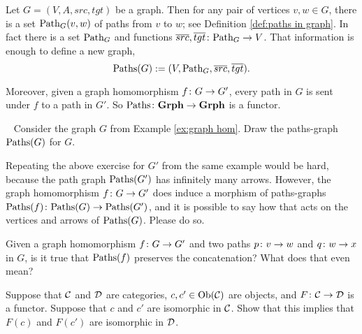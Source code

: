 \begin{example}\label{ex:paths-graph}

Let $G=(V,A,src,tgt)$ be a graph. Then for any pair of vertices $v,w\in G$, there is a set $\textnormal{Path}_G(v,w)$ of paths from $v$ to $w$; see Definition \ref{def:paths in graph}. In fact there is a set $\textnormal{Path}_G$ and functions $\overline{src},\overline{tgt}\colon\textnormal{Path}_G\rightarrow V$. That information is enough to define a new graph, $$\textnormal{Paths}(G):=(V,\textnormal{Path}_G,\overline{src},\overline{tgt}).$$

Moreover, given a graph homomorphism $f\colon G\rightarrow G'$, every path in $G$ is sent under $f$ to a path in $G'$. So $\textnormal{Paths}\colon{\bf Grph}\rightarrow{\bf Grph}$ is a functor.

\end{example}

\begin{exercise}\label{exc:morphisms on paths-graphs}~
\sexc Consider the graph $G$ from Example \ref{ex:graph hom}. Draw the paths-graph $\textnormal{Paths}(G)$ for $G$. 
\item Repeating the above exercise for $G'$ from the same example would be hard, because the path graph $\textnormal{Paths}(G')$ has infinitely many arrows. However, the graph homomorphism $f\colon G\rightarrow G'$ does induce a morphism of paths-graphs $\textnormal{Paths}(f)\colon\textnormal{Paths}(G)\rightarrow\textnormal{Paths}(G')$, and it is possible to say how that acts on the vertices and arrows of $\textnormal{Paths}(G)$. Please do so.
\item Given a graph homomorphism $f\colon G\rightarrow G'$ and two paths $p\colon v\rightarrow w$ and $q\colon w\rightarrow x$ in $G$, is it true that $\textnormal{Paths}(f)$ preserves the concatenation? What does that even mean?
\endsexc
\end{exercise}

\begin{exercise}\label{exc:functors preserve isos}
Suppose that $\mathcal{C}$ and $\mathcal{D}$ are categories, $c,c'\in\textnormal{Ob}(\mathcal{C})$ are objects, and $F\colon\mathcal{C}\rightarrow\mathcal{D}$ is a functor. Suppose that $c$ and $c'$ are isomorphic in $\mathcal{C}$. Show that this implies that $F(c)$ and $F(c')$ are isomorphic in $\mathcal{D}$.
\end{exercise}

